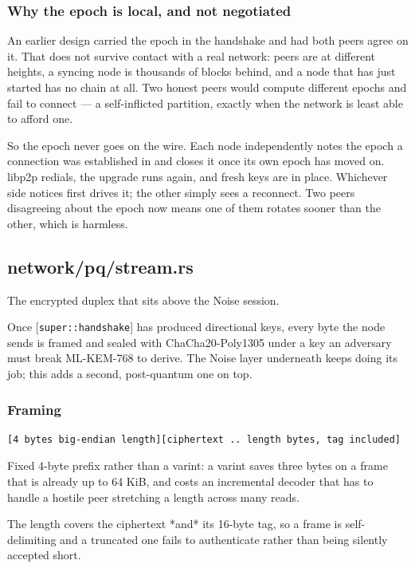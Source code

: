\documentclass[11pt,a4paper]{article}
\begin{document}
\subsubsection{Why the epoch is local, and not negotiated}

An earlier design carried the epoch in the handshake and had both peers
agree on it. That does not survive contact with a real network: peers are at
different heights, a syncing node is thousands of blocks behind, and a node
that has just started has no chain at all. Two honest peers would compute
different epochs and fail to connect — a self-inflicted partition, exactly
when the network is least able to afford one.

So the epoch never goes on the wire. Each node independently notes the epoch
a connection was established in and closes it once its own epoch has moved
on. libp2p redials, the upgrade runs again, and fresh keys are in place.
Whichever side notices first drives it; the other simply sees a reconnect.
Two peers disagreeing about the epoch now means one of them rotates sooner
than the other, which is harmless.

\subsection{network/pq/stream.rs}
The encrypted duplex that sits above the Noise session.

Once [\texttt{super::handshake}] has produced directional keys, every byte the node
sends is framed and sealed with ChaCha20-Poly1305 under a key an adversary
must break ML-KEM-768 to derive. The Noise layer underneath keeps doing its
job; this adds a second, post-quantum one on top.

\subsubsection{Framing}

\begin{verbatim}
[4 bytes big-endian length][ciphertext .. length bytes, tag included]
\end{verbatim}

Fixed 4-byte prefix rather than a varint: a varint saves three bytes on a
frame that is already up to 64 KiB, and costs an incremental decoder that
has to handle a hostile peer stretching a length across many reads.

The length covers the ciphertext *and* its 16-byte tag, so a frame is
self-delimiting and a truncated one fails to authenticate rather than being
silently accepted short.
\end{document}

